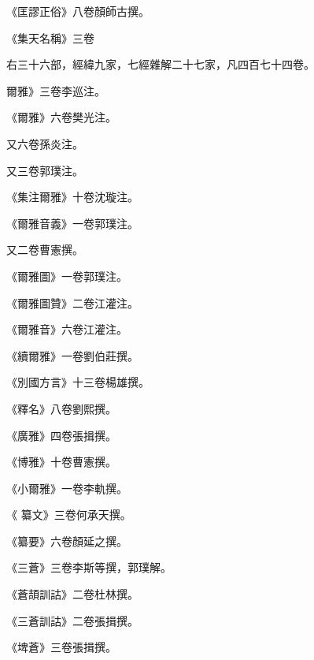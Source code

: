 \begin{pinyinscope}
 《匡謬正俗》八卷顏師古撰。



 《集天名稱》三卷



 右三十六部，經緯九家，七經雜解二十七家，凡四百七十四卷。



 爾雅》三卷李巡注。



 《爾雅》六卷樊光注。



 又六卷孫炎注。



 又三卷郭璞注。



 《集注爾雅》十卷沈璇注。



 《爾雅音義》一卷郭璞注。



 又二卷曹憲撰。



 《爾雅圖》一卷郭璞注。



 《爾雅圖贊》二卷江灌注。



 《爾雅音》六卷江灌注。



 《續爾雅》一卷劉伯莊撰。



 《別國方言》十三卷楊雄撰。



 《釋名》八卷劉熙撰。



 《廣雅》四卷張揖撰。



 《博雅》十卷曹憲撰。



 《小爾雅》一卷李軌撰。



 《
 纂文》三卷何承天撰。



 《纂要》六卷顏延之撰。



 《三蒼》三卷李斯等撰，郭璞解。



 《蒼頡訓詁》二卷杜林撰。



 《三蒼訓詁》二卷張揖撰。



 《埤蒼》三卷張揖撰。




\end{pinyinscope}
